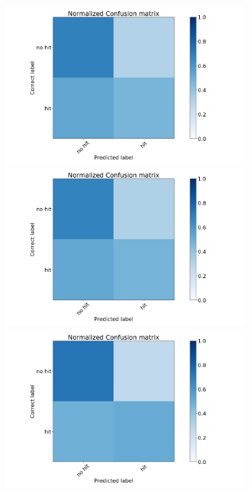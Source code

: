 \documentclass[journal]{IEEEtran}
\begin{document}
{{\begin{figure}[h!]
\begin{subfigure}{0.5\textwidth}
\centering
\includegraphics[scale=0.12]{Images/Classification_test/matrix_a.png}
\includegraphics[scale=0.12]{Images/Classification_test/matrix_c.png}\\
\includegraphics[scale=0.12]{Images/Classification_test/matrix_d.png}

\end{subfigure}
\end{figure}}}
\end{document}
